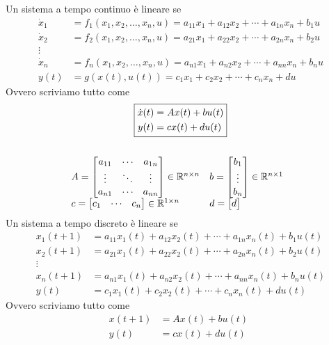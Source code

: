 \documentclass[10pt,a4paper]{book}
\begin{document}
Un sistema a tempo continuo è lineare se
\begin{align*}
	\dot{x}_1 & =f_1(x_1 ,x_2 ,\dotsc ,x_n ,u) =a_{11} x_1 +a_{12} x_2 +\cdots +a_{1n} x_n +b_1 u \\
	\dot{x}_2 & =f_2(x_1 ,x_2 ,\dotsc ,x_n ,u) =a_{21} x_1 +a_{22} x_2 +\cdots +a_{2n} x_n +b_2 u \\
	\vdots    &                                                                                    \\
	\dot{x}_n & =f_n(x_1 ,x_2 ,\dotsc ,x_n ,u) =a_{n1} x_1 +a_{n2} x_2 +\cdots +a_{nn} x_n +b_n u \\
	y(t)      & =g(x(t),u(t))=c_1 x_1 +c_2 x_2 +\cdots +c_n x_n +du                               
\end{align*}
Ovvero scriviamo tutto come
\begin{gather*}
	\boxed{
		\begin{aligned}
			\dot{x}(t) & =Ax(t) +bu(t) \\
			y(t)       & =cx(t) +du(t) 
		\end{aligned}
		}\\
	\\
	\begin{array}{ l l }
		A=\begin{bmatrix}
		a_{11} & \cdots & a_{1n} \\
		\vdots & \ddots & \vdots \\
		a_{n1} & \cdots & a_{nn} 
		\end{bmatrix} \in \mathbb{R}^{n\times n} & b=\begin{bmatrix}
		b_1\\
		\vdots \\
		b_n
		\end{bmatrix} \in \mathbb{R}^{n\times 1}\\
		c=\begin{bmatrix}
		c_1    & \cdots & c_n    
		\end{bmatrix} \in \mathbb{R}^{1\times n} & d=\begin{bmatrix}
		d
		\end{bmatrix}
	\end{array} \ \ 
\end{gather*}
Un sistema a tempo discreto è lineare se
\begin{align*}
	x_1(t+1) & =a_{11} x_1(t) +a_{12} x_2(t) +\cdots +a_{1n} x_n(t) +b_1 u(t) \\
	x_2(t+1) & =a_{21} x_1(t) +a_{22} x_2(t) +\cdots +a_{2n} x_n(t) +b_2 u(t) \\
	\vdots    &                                                                \\
	x_n(t+1) & =a_{n1} x_1(t) +a_{n2} x_2(t) +\cdots +a_{nn} x_n(t) +b_n u(t) \\
	y(t)      & =c_1 x_1(t) +c_2 x_2(t) +\cdots +c_n x_n(t) +du(t)             
\end{align*}
Ovvero scriviamo tutto come
\begin{equation*}
	\boxed{
		\begin{aligned}
			x(t+1) & =Ax(t) +bu(t) \\
			y(t)    & =cx(t) +du(t) 
		\end{aligned} \ \ }
\end{equation*}
\end{document}
